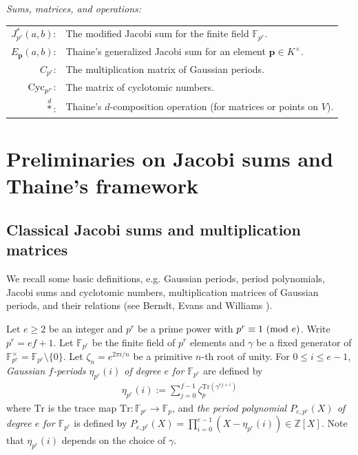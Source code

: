 \documentclass[a4paper, 11pt]{amsart}
\newcommand{\Z}{\mathbb Z}
\newcommand{\F}{\mathbb F}
\theoremstyle{plain}
\theoremstyle{definition}
\numberwithin{equation}{section}
\begin{document}
\medskip
\textit{Sums, matrices, and operations:}
\par\smallskip
\begin{tabular}{@{} r @{\quad} l}
 $J_{p^r}^*(a,b)$: & The modified Jacobi sum for the finite field $\mathbb{F}_{p^r}$. \\
 $E_{\mathbf{p}}(a,b)$: & Thaine's generalized Jacobi sum for an element $\mathbf{p} \in K^\times$. \\
 $C_{p^r}$: & The multiplication matrix of Gaussian periods. \\
 ${\rm Cyc}_{p^r}$: & The matrix of cyclotomic numbers. \\
 $\overset{d}{\ast}$: & Thaine's $d$-composition operation (for matrices or points on $V$). \\
\end{tabular}

\section{Preliminaries on Jacobi sums and Thaine's framework}\label{S2}
\subsection{Classical Jacobi sums and multiplication matrices}\label{S2-1}
We recall some basic definitions, e.g. 
Gaussian periods, period polynomials, Jacobi sums and cyclotomic numbers, 
multiplication matrices of Gaussian periods, 
and their relations (see Berndt, Evans and Williams \cite{BEW98}). 

Let $e \geq 2$ be an integer and 
$p^r$ be a prime power with $p^r \equiv 1\ ({\rm mod}\ e)$. 
Write $p^r=ef+1$. 
Let $\F_{p^r}$ be the finite field of $p^r$ elements 
and $\gamma$ be a fixed generator of 
$\F_{p^r}^{\times}=\F_{p^r}\setminus \{0\}$. 
Let $\zeta_n=e^{2\pi i/n}$ be a primitive $n$-th root of unity. 
For $0 \leq i \leq e-1$, 
{\it Gaussian $f$-periods $\eta_{p^r}(i)$ of degree $e$ for $\F_{p^r}$} 
are defined by
\begin{align*}
\eta_{p^r}(i) := \sum^{f-1}_{j=0}\zeta_p^{\mathrm{Tr}(\gamma^{ej+i})}
\end{align*}
where $\mathrm{Tr}$ is the trace map $\mathrm{Tr} : \F_{p^r} \to \F_p$, 
and {\it the period polynomial $P_{e,p^r}(X)$ of degree $e$ for $\F_{p^r}$} 
is defined by $P_{e,p^r}(X)= \prod^{e-1}_{i=0}\left(X-\eta_{p^r}(i)\right)\in\Z[X]$. 
Note that $\eta_{p^r}(i)$ depends on the choice of $\gamma$. 
\end{document}
